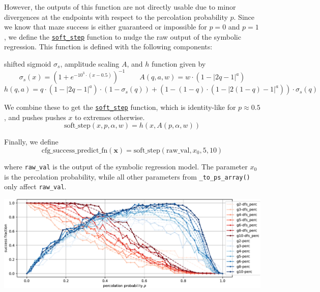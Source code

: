 \documentclass[10pt,a4paper,onecolumn]{article}
\let\origfigure\figure
\let\endorigfigure\endfigure
\renewenvironment{figure}[1][2] {
    \expandafter\origfigure\expandafter[H]
} {
    \endorigfigure
}
\begin{document}
However, the outputs of this function are not directly usable due to
minor divergences at the endpoints with respect to the percolation
probability \(p\). Since we know that maze success is either guaranteed
or impossible for \(p=0\) and \(p=1\), we define the
\href{https://understanding-search.github.io/maze-dataset/maze_dataset/dataset/success_predict_math.html\#soft_step}{\texttt{soft\_step}}
function to nudge the raw output of the symbolic regression. This
function is defined with the following components:

shifted sigmoid \(\sigma_s\), amplitude scaling \(A\), and \(h\)
function given by \[
  \sigma_s(x) = (1 + e^{-10^3 \cdot (x-0.5)})^{-1}
  \qquad A(q,a,w) = w \cdot (1 - |2q-1|^a)
\] \[
  h(q,a) = q \cdot (1 - |2q-1|^a) \cdot (1-\sigma_s(q)) + (1-(1-q) \cdot (1 - |2(1-q)-1|^a)) \cdot \sigma_s(q)
\]

We combine these to get the
\href{https://understanding-search.github.io/maze-dataset/maze_dataset/dataset/success_predict_math.html\#soft_step}{\texttt{soft\_step}}
function, which is identity-like for \(p \approx 0.5\), and pushes
pushes \(x\) to extremes otherwise. \[
  \text{soft\_step}(x, p, \alpha, w) = h(x, A(p, \alpha, w))
\]

Finally, we define \[
  \text{cfg\_success\_predict\_fn}(\mathbf{x}) = \text{soft\_step}(\text{raw\_val}, x_0, 5, 10)
\]

where \texttt{raw\_val} is the output of the symbolic regression model.
The parameter \(x_0\) is the percolation probability, while all other
parameters from \texttt{\_to\_ps\_array()} only affect
\texttt{raw\_val}.

\begin{figure}
\centering
\includegraphics[width=1\textwidth,height=\textheight]{figures/ep/ep_deadends_unique-crop.pdf}
\caption{An example of both empirical and predicted success rates as a
function of the percolation probability \(p\) for various maze sizes,
percolation with and without depth first search, and
\texttt{endpoint\_kwargs} requiring that both the start and end be in
unique dead ends. Empirical measures derived from a sample of 128
mazes.}
\end{figure}
\end{document}
